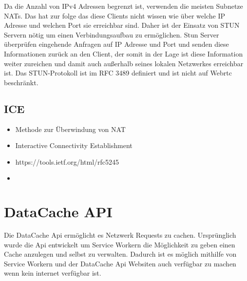 Da die Anzahl von IPv4 Adressen begrenzt ist, verwenden die meisten Subnetze NATs. Das hat zur folge das diese Clients nicht wissen wie über welche IP Adresse und welchen Port sie erreichbar sind. Daher ist der Einsatz von STUN Servern nötig um einen Verbindungsaufbau zu ermöglichen. Stun Server überprüfen eingehende Anfragen auf IP Adresse und Port und senden diese Informationen zurück an den Client, der somit in der Lage ist diese Information weiter zureichen und damit auch außerhalb seines lokalen Netzwerkes erreichbar ist. Das STUN-Protokoll ist im RFC 3489 \cite{rfcStun} definiert und ist nicht auf Webrtc beschränkt.


%
%

\subsection{ICE}

\begin{itemize}
	\item Methode zur Überwindung von NAT
	\item Interactive Connectivity Establishment
	\item https://tools.ietf.org/html/rfc5245
	\item 
\end{itemize}

\section{DataCache API}

Die DataCache Api ermöglicht es Netzwerk Requests zu cachen. Ursprünglich wurde die Api entwickelt um Service Workern die Möglichkeit zu geben einen Cache anzulegen und selbst zu verwalten. Dadurch ist es möglich mithilfe von Service Workern und der DataCache Api Websiten auch verfügbar zu machen wenn kein internet verfügbar ist. 

